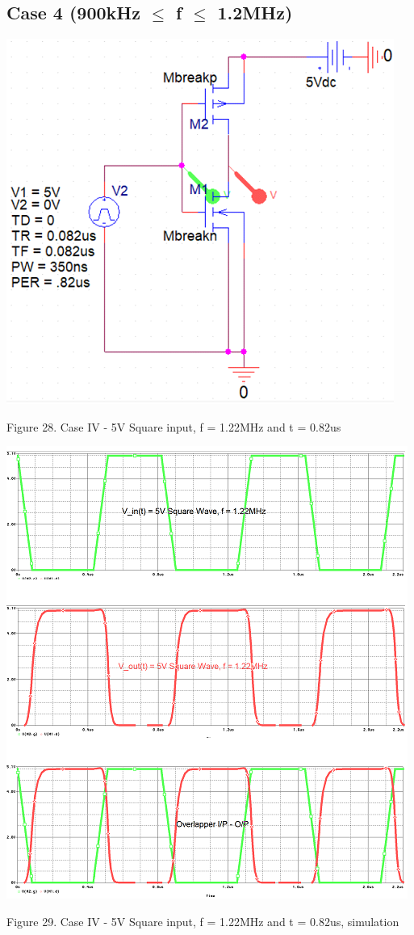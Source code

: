 \documentclass[conference]{IEEEtran}
\begin{document}
\subsection{Case 4 (900kHz $\leq$ f $\leq$ 1.2MHz)}

\begin{center}
    \centerline{\includegraphics[scale = 0.6]{figures/case4_circuit.png}}
    Figure 28. Case IV - 5V Square input, f = 1.22MHz and t = 0.82us
\end{center}

\begin{center}
    \centerline{\includegraphics[scale = 0.6]{figures/case4_results1.png}}
    Figure 29. Case IV - 5V Square input, f = 1.22MHz and t = 0.82us, simulation
\end{center}
\end{document}
